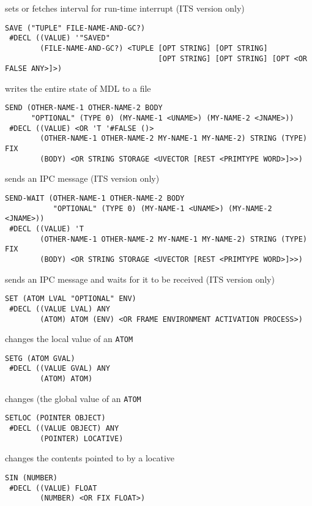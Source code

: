 \documentclass[a4paper]{scrbook}
\begin{document}
sets or fetches interval for run-time interrupt (ITS version only)

\begin{verbatim}
SAVE ("TUPLE" FILE-NAME-AND-GC?)
 #DECL ((VALUE) '"SAVED"
        (FILE-NAME-AND-GC?) <TUPLE [OPT STRING] [OPT STRING]
                                   [OPT STRING] [OPT STRING] [OPT <OR FALSE ANY>]>)
\end{verbatim}

writes the entire state of MDL to a file

\begin{verbatim}
SEND (OTHER-NAME-1 OTHER-NAME-2 BODY
      "OPTIONAL" (TYPE 0) (MY-NAME-1 <UNAME>) (MY-NAME-2 <JNAME>))
 #DECL ((VALUE) <OR 'T '#FALSE ()>
        (OTHER-NAME-1 OTHER-NAME-2 MY-NAME-1 MY-NAME-2) STRING (TYPE) FIX
        (BODY) <OR STRING STORAGE <UVECTOR [REST <PRIMTYPE WORD>]>>)
\end{verbatim}

sends an IPC message (ITS version only)

\begin{verbatim}
SEND-WAIT (OTHER-NAME-1 OTHER-NAME-2 BODY
           "OPTIONAL" (TYPE 0) (MY-NAME-1 <UNAME>) (MY-NAME-2 <JNAME>))
 #DECL ((VALUE) 'T
        (OTHER-NAME-1 OTHER-NAME-2 MY-NAME-1 MY-NAME-2) STRING (TYPE) FIX
        (BODY) <OR STRING STORAGE <UVECTOR [REST <PRIMTYPE WORD>]>>)
\end{verbatim}

sends an IPC message and waits for it to be received (ITS version only)

\begin{verbatim}
SET (ATOM LVAL "OPTIONAL" ENV)
 #DECL ((VALUE LVAL) ANY
        (ATOM) ATOM (ENV) <OR FRAME ENVIRONMENT ACTIVATION PROCESS>)
\end{verbatim}

changes the local value of an \texttt{ATOM}

\begin{verbatim}
SETG (ATOM GVAL)
 #DECL ((VALUE GVAL) ANY
        (ATOM) ATOM)
\end{verbatim}

changes (the global value of an \texttt{ATOM}

\begin{verbatim}
SETLOC (POINTER OBJECT)
 #DECL ((VALUE OBJECT) ANY
        (POINTER) LOCATIVE)
\end{verbatim}

changes the contents pointed to by a locative

\begin{verbatim}
SIN (NUMBER)
 #DECL ((VALUE) FLOAT
        (NUMBER) <OR FIX FLOAT>)
\end{verbatim}
\end{document}
